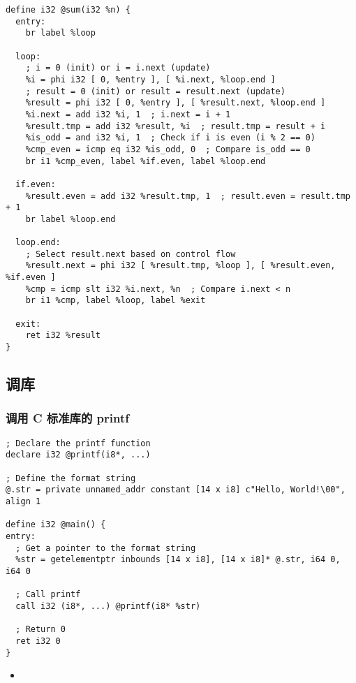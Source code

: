 \begin{lstlisting}[language=none]
define i32 @sum(i32 %n) {
  entry:
    br label %loop

  loop:
    ; i = 0 (init) or i = i.next (update)
    %i = phi i32 [ 0, %entry ], [ %i.next, %loop.end ]
    ; result = 0 (init) or result = result.next (update)
    %result = phi i32 [ 0, %entry ], [ %result.next, %loop.end ]
    %i.next = add i32 %i, 1  ; i.next = i + 1
    %result.tmp = add i32 %result, %i  ; result.tmp = result + i
    %is_odd = and i32 %i, 1  ; Check if i is even (i % 2 == 0)
    %cmp_even = icmp eq i32 %is_odd, 0  ; Compare is_odd == 0
    br i1 %cmp_even, label %if.even, label %loop.end

  if.even:
    %result.even = add i32 %result.tmp, 1  ; result.even = result.tmp + 1
    br label %loop.end

  loop.end:
    ; Select result.next based on control flow
    %result.next = phi i32 [ %result.tmp, %loop ], [ %result.even, %if.even ]
    %cmp = icmp slt i32 %i.next, %n  ; Compare i.next < n
    br i1 %cmp, label %loop, label %exit

  exit:
    ret i32 %result
}
\end{lstlisting}

\subsection{调库}

\subsubsection{调用 C 标准库的 printf}
\begin{lstlisting}[language=none]
; Declare the printf function
declare i32 @printf(i8*, ...)

; Define the format string
@.str = private unnamed_addr constant [14 x i8] c"Hello, World!\00", align 1

define i32 @main() {
entry:
  ; Get a pointer to the format string
  %str = getelementptr inbounds [14 x i8], [14 x i8]* @.str, i64 0, i64 0

  ; Call printf
  call i32 (i8*, ...) @printf(i8* %str)

  ; Return 0
  ret i32 0
}
\end{lstlisting}

\begin{itemize}
\item 
\end{itemize}
